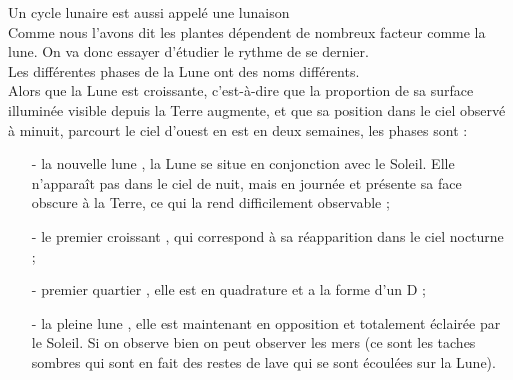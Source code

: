 Un cycle lunaire est aussi appelé une lunaison \\
Comme nous l’avons dit les plantes dépendent de nombreux facteur comme la lune. On va donc essayer d’étudier le rythme de se dernier.\\
Les différentes phases de la Lune ont des noms différents.\\
Alors que la Lune est croissante, c'est-à-dire que la proportion de sa surface illuminée visible depuis la Terre augmente, et que sa position dans le ciel observé à minuit, parcourt le ciel d'ouest en est en deux semaines, les phases sont :
 \begin{itemize}
\item[-]la nouvelle lune , la Lune se situe en conjonction avec le Soleil. Elle n'apparaît pas dans le ciel de nuit, mais en journée et présente sa face obscure à la Terre, ce qui la rend difficilement observable ;
\item[-]le premier croissant , qui correspond à sa réapparition dans le ciel nocturne ;
\item[-]premier quartier , elle est en quadrature et a la forme d'un D ;
\item[-]la pleine lune , elle est maintenant en opposition et totalement éclairée par le Soleil. Si on observe bien on peut observer les mers (ce sont les taches sombres qui sont en fait des restes de lave qui se sont écoulées sur la Lune).
 \end{itemize}
